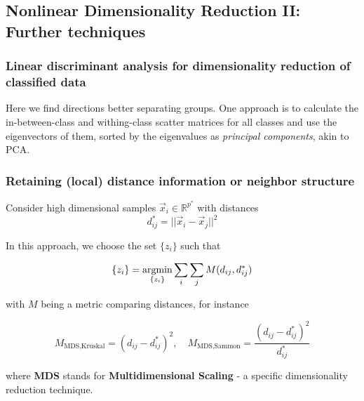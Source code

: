\subsection{Nonlinear Dimensionality Reduction II: Further techniques}
\subsubsection{Linear discriminant analysis for dimensionality reduction of classified data}
Here we find directions better separating groups. One
approach is to calculate the in-between-class and
withing-class scatter matrices for all classes and
use the eigenvectors of them, sorted by the eigenvalues
as \textit{principal components}, akin to PCA.

\subsubsection{Retaining (local) distance information or neighbor structure}
Consider high dimensional samples $\vec{x}_i \in \mathbb{R}^{p^*}$ with distances
\begin{equation}
    d_{ij}^* = ||\vec{x}_i - \vec{x}_j||^2
\end{equation}

In this approach, we choose the set $\{ z_i \}$ such that

\begin{equation}
    \{ z_i \} = \operatorname*{argmin}_{\{ z_i \}} \sum_i \sum_j M(d_{ij}, d^*_{ij})
\end{equation}

with $M$ being a metric comparing distances, for instance

\begin{equation}
    M_{\text{MDS,Kruskal}} = (d_{ij} - d^*_{ij})^2, \quad M_{\text{MDS,Sammon}} = \frac{(d_{ij} - d^*_{ij})^2}{d^*_{ij}}
\end{equation}

where \textbf{MDS} stands for \textbf{Multidimensional Scaling} - a specific
dimensionality reduction technique.


